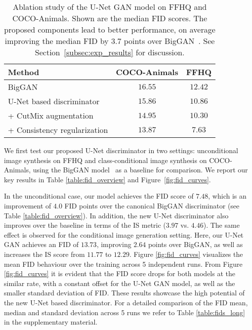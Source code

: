 \documentclass[10pt,twocolumn,letterpaper]{article}
\begin{document}
\begin{table}
	\vspace{-1em}
	\setlength{\tabcolsep}{0.0em}
	\renewcommand{\arraystretch}{1.1}
	\centering



	\begin{tabular}{lc@{ \hskip 0.05in}c}
		\normalsize{} Method & \normalsize{} COCO-Animals  & \normalsize{} FFHQ  \tabularnewline
		\hline 	\hline
		\normalsize{} BigGAN \cite{Brock2019} & \normalsize{} $16.55$  & \normalsize{} $12.42$ \tabularnewline
		\hline
		\normalsize{} U-Net based discriminator        & \normalsize{} $15.86$  & \normalsize{} $10.86$	\tabularnewline
		\normalsize{} \quad + CutMix augmentation      & \normalsize{} $14.95$  & \normalsize{} $10.30$ \tabularnewline
		\normalsize{} \quad\quad+ Consistency regularization & \normalsize{} $\mathbf{13.87}$  & \normalsize{}  $\mathbf{7.63}$ \tabularnewline
	\end{tabular}


\vspace{-0.5em}
    \caption{Ablation study of the U-Net GAN model on FFHQ and COCO-Animals. Shown are the median FID scores.
   The proposed components lead to better performance, on average improving the median FID by $3.7$ points over BigGAN~\cite{Brock2019}. See Section~\ref{subsec:exp_results} for discussion. 
}
   \label{table:fid_ablation} \vspace{-1em}
\end{table}
 
We first test our proposed U-Net discriminator in two settings: unconditional image synthesis on FFHQ and 
class-conditional image synthesis on COCO-Animals, using the BigGAN model~\cite{Brock2019} as a baseline for comparison. We report our key results in Table \ref{table:fid_overview} and Figure~\ref{fig:fid_curves}. 

In the unconditional case, our model achieves the FID score of $7.48$, which is an improvement of $4.0$ FID points over the canonical BigGAN discriminator (see Table \ref{table:fid_overview}). In addition, the new U-Net discriminator also improves over the baseline in terms of the IS metric ($3.97$ vs. $4.46$).  
The same effect is observed for the conditional image generation setting. Here, our U-Net GAN achieves an FID of $13.73$, improving $2.64$ points over BigGAN, as well as increases the IS score from $11.77$ to $12.29$. 
Figure \ref{fig:fid_curves} visualizes the mean FID behaviour over the training across 5 independent runs.
From Figure \ref{fig:fid_curves} it is evident that the FID score drops for both models at the similar rate, with a constant offset for the U-Net GAN model, as well as the smaller standard deviation of FID. These results showcase the high potential of the new U-Net based discriminator.
For a detailed comparison of the FID mean, median and standard deviation across 5 runs we refer to Table \ref{table:fids_long} in the supplementary material. 
\end{document}
